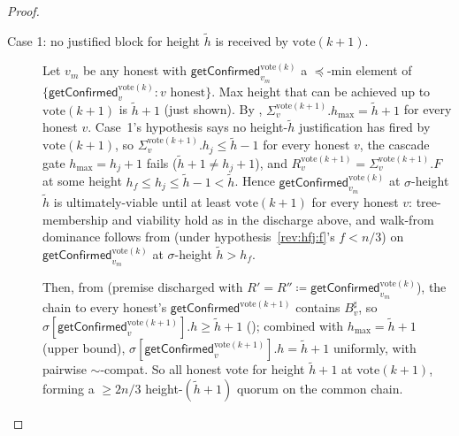 \documentclass{article}
\newcommand{\hmax}{\ensuremath{h_{\max}}\xspace}
\newcommand{\uviable}{ultimately-viable\xspace}
\newcommand{\vote}{\ensuremath{\mathrm{vote}}}
\newcommand{\comm}[1]{\ensuremath{\widetilde{#1}}}
\newcommand{\getConfirmed}{\textsf{getConfirmed}\xspace}
\theoremstyle{plain}
\theoremstyle{definition}
\theoremstyle{remark}
\begin{document}
\begin{proof}
\begin{description}
  \item[Case 1: no justified block for height $\comm{h}$ is received by $\vote(k+1)$.]
  Let $v_m$ be any honest with $\getConfirmed_{v_m}^{\vote(k)}$ a $\preceq$-min element of $\{\getConfirmed_v^{\vote(k)} : v \text{ honest}\}$.
  Max height that can be achieved up to $\vote(k+1)$ is $\comm{h}+1$ (just shown).
  By , $\Sigma_v^{\vote(k+1)}.\hmax = \comm{h}+1$ for every honest $v$.
  Case~1's hypothesis says no height-$\comm{h}$ justification has fired by $\vote(k+1)$, so $\Sigma_v^{\vote(k+1)}.h_j \leq \comm{h}-1$ for every honest $v$, the cascade gate $\hmax = h_j+1$ fails ($\comm{h}+1 \neq h_j+1$), and $R_v^{\vote(k+1)} = \Sigma_v^{\vote(k+1)}.F$ at some height $h_f \leq h_j \leq \comm{h}-1 < \comm{h}$.
  Hence $\getConfirmed_{v_m}^{\vote(k)}$ at $\sigma$-height $\comm{h}$ is \uviable until at least $\vote(k+1)$ for every honest $v$:
  tree-membership and viability hold as in the discharge above, and walk-from dominance follows from  (under hypothesis~\ref{rev:hfj:f}'s $f<n/3$) on $\getConfirmed_{v_m}^{\vote(k)}$ at $\sigma$-height $\comm{h} > h_f$.

  Then, from  (premise discharged with $R' = R'' \coloneqq \getConfirmed_{v_m}^{\vote(k)}$), the chain to every honest's $\getConfirmed^{\vote(k+1)}$ contains $B^\sharp_v$, so $\sigma[\getConfirmed_v^{\vote(k+1)}].h \geq \comm{h}+1$ ();
  combined with $\hmax = \comm{h}+1$ (upper bound), $\sigma[\getConfirmed_v^{\vote(k+1)}].h = \comm{h}+1$ uniformly, with pairwise $\sim$-compat.
  So all honest vote for height $\comm{h}+1$ at $\vote(k+1)$, forming a $\geq 2n/3$ height-$(\comm{h}+1)$ quorum on the common chain.


\end{description}
\end{proof}
\end{document}
